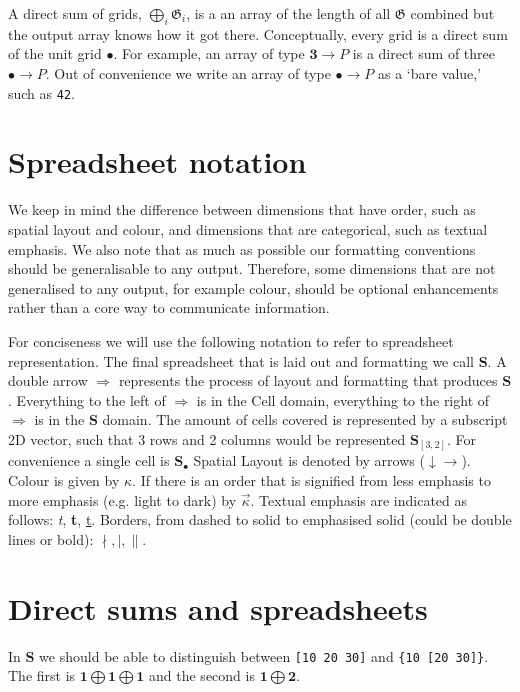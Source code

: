 \documentclass[11pt]{article}
\newcommand{\gr}[1]{\mathfrak{#1}}
\newcommand{\GG}{\gr{G}}
\newcommand{\unit}{\bullet}
\newcommand{\one}{\mathbf{1}}
\newcommand{\two}{\mathbf{2}}
\newcommand{\three}{\mathbf{3}}
\newcommand{\cell}{\mathbf{S}_\bullet}
\begin{document}
A direct sum of grids, \(\bigoplus_i \GG_i\), is a an array of the length of all \(\GG\) combined but the output array knows how it got there. Conceptually, every grid is a direct sum of the unit grid $\unit$. For example, an array of type $\three \to P$ is a direct sum of three $\unit \to P$. Out of convenience we write an array of type $\unit\to P$ as a `bare value,' such as \verb|42|.

\section{Spreadsheet notation}

We keep in mind the difference between dimensions that have order, such as spatial layout and colour, and dimensions that are categorical, such as textual emphasis. We also note that as much as possible our formatting conventions should be generalisable to any output. Therefore, some dimensions that are not generalised to any output, for example colour, should be optional enhancements rather than a core way to communicate information.

For conciseness we will use the following notation to refer to spreadsheet representation. The final spreadsheet that is laid out and formatting we call $\mathbf{S}$. A double arrow $\Rightarrow$ represents the process of layout and formatting that produces $\mathbf{S}$. Everything to the left of $\Rightarrow$ is in the Cell domain, everything to the right of $\Rightarrow$ is in the $\mathbf{S}$ domain. The amount of cells covered is represented by a subscript 2D vector, such that 3 rows and 2 columns would be represented $\mathbf{S}_{[3,2]}$. For convenience a single cell is $\cell$   Spatial Layout is denoted by arrows ($\downarrow \rightarrow$). Colour is given by $\kappa$. If there is an order that is signified from less emphasis to more emphasis (e.g. light to dark) by $\overrightarrow{\kappa}$. Textual emphasis are indicated as follows: \textit{t}, \textbf{t}, \underline{t}. Borders, from dashed to solid to emphasised solid (could be double lines or bold): $\nmid, \mid, \parallel$. 

\section{Direct sums and spreadsheets} 

In $\mathbf{S}$ we should be able to distinguish between \verb|[10 20 30]| and \verb|{10 [20 30]}|. The first is $\one \bigoplus \one \bigoplus \one$ and the second is $\one \bigoplus \two$. 
\end{document}
